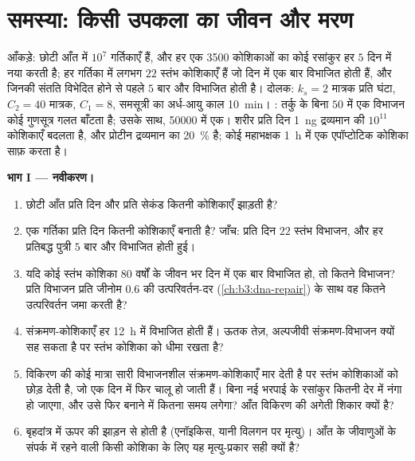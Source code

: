 \section{समस्या: किसी उपकला का जीवन और मरण}

\begin{problem}
\label{pb:b3:cell-cycle-apoptosis:1}
आँकड़े: छोटी आँत में $10^{7}$ गर्तिकाएँ हैं, और हर एक \num{3500}
कोशिकाओं का कोई रसांकुर हर $5$ दिन में नया करती है; हर गर्तिका में
लगभग $22$ स्तंभ कोशिकाएँ हैं जो दिन में एक बार विभाजित होती हैं, और
जिनकी संतति विभेदित होने से पहले $5$ बार और विभाजित होती है। दोलक:
$k_{s} = 2$  मात्रक प्रति घंटा,
$C_{2} = 40$ मात्रक, $C_{1} = 8$, समसूत्री  का अर्ध-आयु काल
\qty{10}{min}। : तर्कु  के बिना $50$ में एक विभाजन
कोई गुणसूत्र गलत बाँटता है; उसके साथ, \num{50000} में एक। शरीर प्रति
दिन \qty{1}{ng} द्रव्यमान की $10^{11}$ कोशिकाएँ बदलता है, और प्रोटीन
द्रव्यमान का \qty{20}{\%} है; कोई महाभक्षक \qty{1}{h} में एक एपॉप्टोटिक
कोशिका साफ़ करता है।

\medskip
\noindent\textbf{भाग I --- नवीकरण।}
\begin{enumerate}
  \item छोटी आँत प्रति दिन और प्रति सेकंड कितनी कोशिकाएँ झाड़ती है?
  \item एक गर्तिका प्रति दिन कितनी कोशिकाएँ बनाती है? जाँच: प्रति दिन
        $22$ स्तंभ विभाजन, और हर प्रतिबद्ध पुत्री $5$ बार और विभाजित
        होती हुई।
  \item यदि कोई स्तंभ कोशिका $80$ वर्षों के जीवन भर दिन में एक बार
        विभाजित हो, तो कितने विभाजन? प्रति विभाजन प्रति जीनोम $0.6$ की
        उत्परिवर्तन-दर (\cref{ch:b3:dna-repair}) के साथ वह कितने
        उत्परिवर्तन जमा करती है?
  \item संक्रमण-कोशिकाएँ हर \qty{12}{h} में विभाजित होती हैं। ऊतक तेज़,
        अल्पजीवी संक्रमण-विभाजन क्यों सह सकता है पर स्तंभ कोशिका को
        धीमा रखता है?
  \item विकिरण की कोई मात्रा सारी विभाजनशील संक्रमण-कोशिकाएँ मार देती
        है पर स्तंभ कोशिकाओं को छोड़ देती है, जो एक दिन में फिर चालू हो
        जाती हैं। बिना नई भरपाई के रसांकुर कितनी देर में नंगा हो जाएगा,
        और उसे फिर बनाने में कितना समय लगेगा? आँत विकिरण की अगेती शिकार
        क्यों है?
  \item बृहदांत्र में ऊपर की झाड़न  से होती है (एनॉइकिस,
        यानी विलगन पर मृत्यु)। आँत के जीवाणुओं के संपर्क में रहने वाली
        किसी कोशिका के लिए यह मृत्यु-प्रकार सही क्यों है?
\end{enumerate}


\end{problem}
